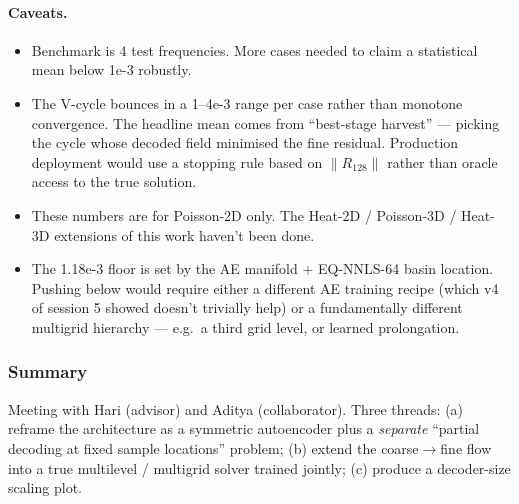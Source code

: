 \paragraph{Caveats.}
\begin{itemize}
  \item Benchmark is 4 test frequencies. More cases needed to claim a
        statistical mean below 1e-3 robustly.
  \item The V-cycle bounces in a 1--4e-3 range per case rather than
        monotone convergence. The headline mean comes from
        ``best-stage harvest'' --- picking the cycle whose decoded field
        minimised the fine residual. Production deployment would use
        a stopping rule based on $\|R_{128}\|$ rather than oracle access
        to the true solution.
  \item These numbers are for Poisson-2D only. The Heat-2D / Poisson-3D
        / Heat-3D extensions of this work haven't been done.
  \item The 1.18e-3 floor is set by the AE manifold + EQ-NNLS-64 basin
        location. Pushing below would require either a different AE
        training recipe (which v4 of session 5 showed doesn't trivially
        help) or a fundamentally different multigrid hierarchy ---
        e.g.\ a third grid level, or learned prolongation.
\end{itemize}



\subsubsection*{Summary}
Meeting with Hari (advisor) and Aditya (collaborator). Three threads:
(a) reframe the architecture as a symmetric autoencoder plus a
\emph{separate} ``partial decoding at fixed sample locations'' problem;
(b) extend the coarse$\rightarrow$fine flow into a true multilevel /
multigrid solver trained jointly; (c) produce a decoder-size scaling
plot.

